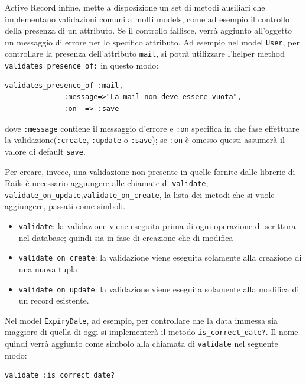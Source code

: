 \documentclass[11pt,a4paper]{article}
\begin{document}
Active Record infine, mette a disposizione un set di metodi ausiliari che implementano validazioni comuni a molti models, come ad esempio il controllo della presenza di un attributo. Se il controllo fallisce, verrà aggiunto all'oggetto un messaggio di errore per lo specifico attributo.
Ad esempio nel model \verb|User|, per controllare la presenza dell'attributo \verb|mail|, si potrà utilizzare l'helper method \verb|validates_presence_of:| in questo modo:\\
\begin{verbatim}
validates_presence_of :mail,
		      :message=>"La mail non deve essere vuota",
		      :on  => :save
\end{verbatim}
dove \verb|:message| contiene il messaggio d'errore e \verb|:on| specifica in che fase effettuare la validazione(\verb|:create|, \verb|:update| o \verb|:save|); se \verb|:on| è omesso questi assumerà il valore di default \verb|save|.

Per creare, invece, una validazione non presente in quelle fornite dalle librerie di Rails è necessario aggiungere alle chiamate di \verb|validate|,\\ \verb|validate_on_update|,\verb|validate_on_create|, la lista dei metodi che si vuole aggiungere, passati come simboli.
\begin{itemize}
 \item \verb|validate|: la validazione viene eseguita prima di ogni operazione di scrittura nel database; quindi sia in fase di creazione che di modifica
 \item \verb|validate_on_create|: la validazione viene eseguita solamente alla creazione di una nuova tupla
 \item \verb|validate_on_update|: la validazione viene eseguita solamente alla modifica di un record esistente.
\end{itemize}

Nel model \verb|ExpiryDate|, ad esempio, per controllare che la data immessa sia maggiore di quella di oggi si implementerà il metodo \verb|is_correct_date?|. Il nome quindi verrà aggiunto come simbolo alla chiamata di \verb|validate| nel seguente modo: \\
\begin{verbatim}
validate :is_correct_date?
\end{verbatim}
\end{document}

